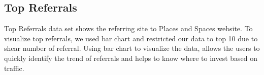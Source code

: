 \subsection{Top Referrals} \label{viztoprefs}
Top Referrals data set shows the referring site to Places and Spaces website. To visualize top referrals, we used bar chart and restricted our data to top 10 due to shear number of referral. Using bar chart to visualize the data, allows the users to quickly identify the trend of referrals and helps to know where to invest based on traffic.


